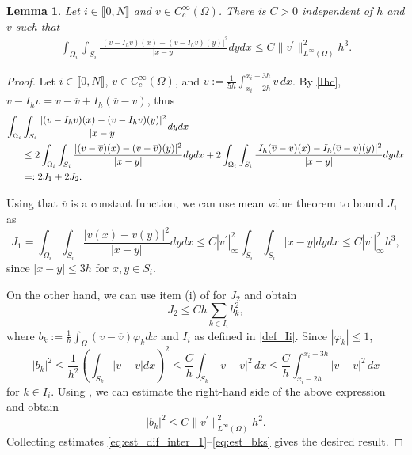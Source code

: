\documentclass[11 pt]{article}
\newcommand\inter[1]{\llbracket #1\rrbracket}
\newtheorem{lemma}[theorem]{Lemma}
\numberwithin{equation}{section}
\begin{document}
\begin{lemma}\label{lem:stab_dif_interp}
Let $i\in\inter{0,N}$ and $v\in C_c^\infty(\Omega)$. There is $C>0$ independent of $h$ and $v$ such that
\begin{align}\label{eq:approxim_estimate}
    \int_{\Omega_i}\int_{S_i}\frac{|(v-I_h v)(x)-(v-I_h v)(y)|^2}{|x-y|}dy dx \leq C \|v^\prime\|^2_{L^\infty(\Omega)} h^3.
\end{align}
\end{lemma}
%
\begin{proof}
Let $i\in\inter{0,N}$, $v\in C_c^\infty(\Omega)$, and $\overline {v}:=\frac{1}{5h}\int_{x_i-2h}^{x_i+3h}v\,dx$.
By \eqref{Ihc}, $v-I_h v=v-\overline{v}+I_h(\overline v - v)$, thus
%
\begin{align}\notag
    \int_{\Omega_i}&\int_{S_i}\frac{|(v-I_h v)(x)-(v-I_h v)(y)|^2}{|x-y|} dy dx \\
    &\leq 2\int_{\Omega_i}\int_{S_i}\frac{|(v-\overline{v})(x)-(v-\overline{v})(y)|^2}{|x-y|}dy dx + 2 \int_{\Omega_i}\int_{S_i}\frac{|I_h(\overline v-{v})(x)-I_h(\overline v-{v})(y)|^2}{|x-y|}dy dx\notag
    \\& =:2J_1+2J_2.\label{eq:est_dif_inter_1}
\end{align}
%

Using that $\overline v$ is a constant function, we can use mean value theorem to bound $J_1$ as
%
\begin{equation}\label{eq:est_J1}
    J_1 = \int_{\Omega_i}\int_{S_i}\frac{|v(x)-v(y)|^2}{|x-y|}dy dx \leq C |v^\prime|^2_{\infty}\int_{S_i}\int_{S_i}|x-y|dy dx \leq C{|v^\prime|^2_{\infty}}h^3,
\end{equation}
since $|x-y|\leq 3h$ for $x,y\in S_i$.

On the other hand, we can use item (i) of  for $J_2$ and obtain
%
\begin{equation}\label{eq:est_J2}
    J_2 \leq Ch\sum_{k\in I_i} b_k^2,
\end{equation}
%
where $b_k:=\frac{1}{h}\int_{\Omega}(v-\overline v)\varphi_k dx$ and $I_i$ as defined in \eqref{def_Ii}. Since $|\varphi_k|\leq 1$,
\begin{equation}\label{abk}
    |b_k|^2
    \leq \frac{1}{h^2}\left(\int_{S_k} |v-\overline v|dx\right)^2
    \leq \frac{C}{h}\int_{S_k}|v-\overline{v}|^2\, dx
    \leq \frac{C}{h}\int_{x_i-2h}^{x_i+3h}|v-\overline{v}|^2\, dx
\end{equation}
for $k\in I_i.$ Using , we can estimate the right-hand side of the above expression and obtain
%
\begin{equation}\label{eq:est_bks}
    |b_k|^2\leq C{\|v^\prime\|^2_{L^\infty(\Omega)}}h^2.
\end{equation}
%
Collecting estimates \eqref{eq:est_dif_inter_1}--\eqref{eq:est_bks} gives the desired result.
\end{proof}
\end{document}
